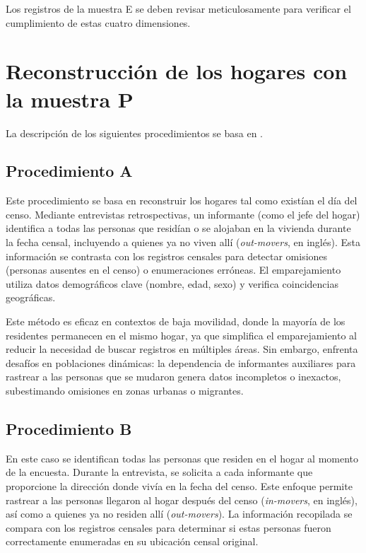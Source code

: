 \documentclass[
  12pt,
]{book}
\begin{document}
Los registros de la muestra E se deben revisar meticulosamente para verificar el cumplimiento de estas cuatro dimensiones.

\section{Reconstrucción de los hogares con la muestra P}\label{sec-procedimientos}

La descripción de los siguientes procedimientos se basa en \citet{UnitedNations_2010}.

\subsection{Procedimiento A}\label{procedimiento-a}

Este procedimiento se basa en reconstruir los hogares tal como existían el día del censo. Mediante entrevistas retrospectivas, un informante (como el jefe del hogar) identifica a todas las personas que residían o se alojaban en la vivienda durante la fecha censal, incluyendo a quienes ya no viven allí (\emph{out-movers}, en inglés). Esta información se contrasta con los registros censales para detectar omisiones (personas ausentes en el censo) o enumeraciones erróneas. El emparejamiento utiliza datos demográficos clave (nombre, edad, sexo) y verifica coincidencias geográficas.

Este método es eficaz en contextos de baja movilidad, donde la mayoría de los residentes permanecen en el mismo hogar, ya que simplifica el emparejamiento al reducir la necesidad de buscar registros en múltiples áreas. Sin embargo, enfrenta desafíos en poblaciones dinámicas: la dependencia de informantes auxiliares para rastrear a las personas que se mudaron genera datos incompletos o inexactos, subestimando omisiones en zonas urbanas o migrantes.

\subsection{Procedimiento B}\label{procedimiento-b}

En este caso se identifican todas las personas que residen en el hogar al momento de la encuesta. Durante la entrevista, se solicita a cada informante que proporcione la dirección donde vivía en la fecha del censo. Este enfoque permite rastrear a las personas llegaron al hogar después del censo (\emph{in-movers}, en inglés), así como a quienes ya no residen allí (\emph{out-movers}). La información recopilada se compara con los registros censales para determinar si estas personas fueron correctamente enumeradas en su ubicación censal original.
\end{document}
